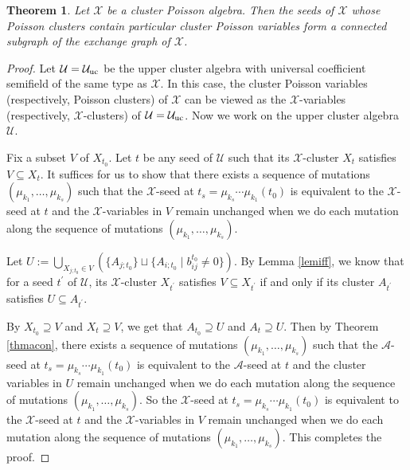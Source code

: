 \documentclass{amsart}
\newtheorem{theorem}{Theorem}[section]
\theoremstyle{definition}
\theoremstyle{remark}
\numberwithin{equation}{section}
\begin{document}
\begin{theorem}\label{thmgraph}
Let $\mathcal X$ be a cluster Poisson algebra. Then the  seeds of  $\mathcal X$ whose Poisson clusters contain particular cluster Poisson variables form a connected subgraph of the exchange graph of $\mathcal X$.
\end{theorem}

\begin{proof}
Let $\mathcal U=\mathcal U_{\rm uc}$ be the upper cluster algebra with universal coefficient semifield of the same type as $\mathcal X$. In this case, the cluster Poisson variables (respectively, Poisson clusters) of $\mathcal X$ can be viewed as the $\mathscr X$-variables (respectively, $\mathscr X$-clusters) of $\mathcal U=\mathcal U_{\rm uc}$. Now we work on the upper cluster algebra $\mathcal U$.


 Fix a subset $V$ of $X_{t_0}$.  Let $t$ be any seed of $\mathcal U$ such that its $\mathscr X$-cluster $X_t$ satisfies $V\subseteq X_t$. It suffices for us to show that there exists a sequence of mutations $(\mu_{k_1},\ldots,\mu_{k_s})$ such that the $\mathscr X$-seed at $t_s=\mu_{k_s}\cdots\mu_{k_1}(t_0)$ is equivalent to the $\mathscr X$-seed at $t$ and the $\mathscr X$-variables in $V$ remain unchanged when we do each mutation along the sequence of mutations $(\mu_{k_1},\ldots,\mu_{k_s})$.

Let $U:=\bigcup\limits_{X_{j;t_0}\in V}(\{A_{j;t_0}\}\sqcup\{A_{i;t_0}\mid b_{ij}^{t_0}\neq 0\})$. By Lemma \ref{lemiff}, we know that for a seed $t^\prime$ of $\mathcal U$, its $\mathscr X$-cluster $X_{t^\prime}$ satisfies $V\subseteq X_{t^\prime}$ if and only if its cluster $A_{t^\prime}$ satisfies $U\subseteq A_{t^\prime}$.

By $X_{t_0}\supseteq V$ and $X_t\supseteq V$, we get that $A_{t_0}\supseteq U$ and $A_t\supseteq U$.
 Then by Theorem \ref{thmacon}, there exists a  sequence of mutations $(\mu_{k_1},\ldots,\mu_{k_s})$ such that the $\mathscr A$-seed at $t_s=\mu_{k_s}\cdots\mu_{k_1}(t_0)$ is equivalent to the $\mathscr A$-seed at $t$ and the cluster variables in $U$ remain unchanged when we do each mutation along the sequence of mutations $(\mu_{k_1},\ldots,\mu_{k_s})$. So the $\mathscr X$-seed at $t_s=\mu_{k_s}\cdots\mu_{k_1}(t_0)$ is equivalent to the $\mathscr X$-seed at $t$ and the $\mathscr X$-variables in $V$ remain unchanged when we do each mutation along the sequence of mutations $(\mu_{k_1},\ldots,\mu_{k_s})$. This completes the proof.
\end{proof}
\end{document}
